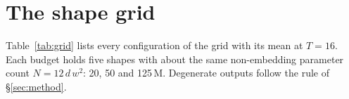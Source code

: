 \section{The shape grid}
\label{app:grid}
Table~\ref{tab:grid} lists every configuration of the grid with its mean at $T{=}16$. Each
budget holds five shapes with about the same non-embedding parameter count
$N = 12\,d\,w^{2}$: 20, 50 and 125\,M. Degenerate outputs follow the rule of
\S\ref{sec:method}.

\begin{center}\captionsetup{hypcap=false}%
\label{tab:grid}
\small

\end{center}

